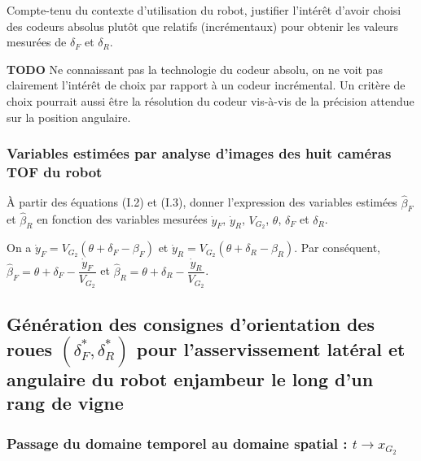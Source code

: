 \documentclass[11pt]{article}
\begin{document}
\UPSTIquestion Compte-tenu du contexte d’utilisation du robot, justifier l’intérêt d’avoir choisi des codeurs absolus
plutôt que relatifs (incrémentaux) pour obtenir les valeurs mesurées de $\delta_F$ et $\delta_R$.

\begin{UPSTIcorrige}
\textbf{TODO}
Ne connaissant pas la technologie du codeur absolu, on ne voit pas clairement l'intérêt de choix par rapport à un codeur incrémental. Un critère de choix pourrait aussi être la résolution du codeur vis-à-vis de la précision attendue sur la position angulaire. 
\end{UPSTIcorrige}

\subsubsection{Variables estimées par analyse d’images des huit caméras TOF du robot}

\UPSTIquestion À partir des équations (I.2) et (I.3), donner l’expression des variables estimées $\hat{\beta}_F$
et $\hat{\beta}_R$ en fonction des variables mesurées $\dot{y}_F$, $\dot{y}_R$, $V_{G_2}$, $\theta$, $\delta_F$ et $\delta_R$.

\begin{UPSTIcorrige}
On a $\dot{y}_F =V_{G_2} \left(\theta + \delta_F - \beta_F\right)$ et $\dot{y}_R =V_{G_2} \left(\theta + \delta_R - \beta_R\right)$. Par conséquent, $\hat{\beta}_F =\theta + \delta_F-\dfrac{\dot{y}_F}{V_{G_2} }  $ et $\hat{\beta}_R =\theta + \delta_R-\dfrac{\dot{y}_R}{V_{G_2} }  $.
\end{UPSTIcorrige}



\subsection{Génération des consignes d’orientation des roues $\left(\delta^*_F,\delta^*_R\right)$ pour l’asservissement latéral et angulaire du robot enjambeur le long d’un rang de vigne}

\subsubsection{Passage du domaine temporel au domaine spatial : $t\to x_{G_2}$}
\end{document}
